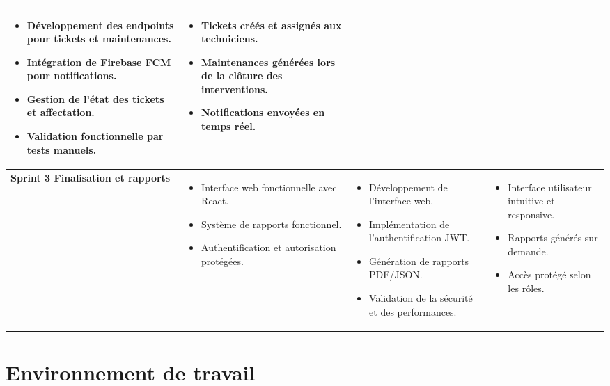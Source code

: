 \begin{longtable}{|p{3cm}|p{4cm}|p{4cm}|p{4cm}|}
\begin{itemize}[leftmargin=4pt]
    \item Développement des endpoints pour tickets et maintenances.
    \item Intégration de Firebase FCM pour notifications.
    \item Gestion de l'état des tickets et affectation.
    \item Validation fonctionnelle par tests manuels.
\end{itemize} &
\begin{itemize}[leftmargin=4pt]
    \item Tickets créés et assignés aux techniciens.
    \item Maintenances générées lors de la clôture des interventions.
    \item Notifications envoyées en temps réel.
\end{itemize} \\
\hline
\textbf{Sprint 3 \newline Finalisation et rapports} &
\begin{itemize}[leftmargin=4pt]
    \item Interface web fonctionnelle avec React.
    \item Système de rapports fonctionnel.
    \item Authentification et autorisation protégées.
\end{itemize} &
\begin{itemize}[leftmargin=4pt]
    \item Développement de l'interface web.
    \item Implémentation de l'authentification JWT.
    \item Génération de rapports PDF/JSON.
    \item Validation de la sécurité et des performances.
\end{itemize} &
\begin{itemize}[leftmargin=4pt]
    \item Interface utilisateur intuitive et responsive.
    \item Rapports générés sur demande.
    \item Accès protégé selon les rôles.
\end{itemize} \\
\hline
\end{longtable}

\section{Environnement de travail}
\label{sec:environnement}


